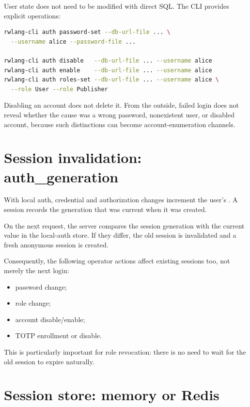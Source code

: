 User state does not need to be modified with direct SQL. The CLI provides explicit operations:

\begin{lstlisting}[language=bash]
rwlang-cli auth password-set --db-url-file ... \
  --username alice --password-file ...

rwlang-cli auth disable   --db-url-file ... --username alice
rwlang-cli auth enable    --db-url-file ... --username alice
rwlang-cli auth roles-set --db-url-file ... --username alice \
  --role User --role Publisher
\end{lstlisting}

Disabling an account does not delete it. From the outside, failed login does not reveal whether the cause was a wrong password, nonexistent user, or disabled account, because such distinctions can become account-enumeration channels.

\section{Session invalidation: auth\_generation}

With local auth, credential and authorization changes increment the user's . A session records the generation that was current when it was created.

On the next request, the server compares the session generation with the current value in the local-auth store. If they differ, the old session is invalidated and a fresh anonymous session is created.

Consequently, the following operator actions affect existing sessions too, not merely the next login:

\begin{itemize}
  \item password change;
  \item role change;
  \item account disable/enable;
  \item TOTP enrollment or disable.
\end{itemize}

This is particularly important for role revocation: there is no need to wait for the old session to expire naturally.

\section{Session store: memory or Redis}

